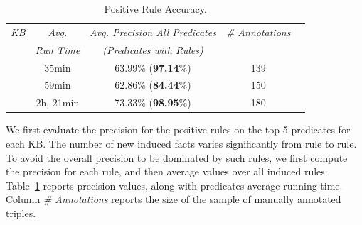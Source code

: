 \begin{table}[b]
	\centering
	\caption{\krd Positive Rule Accuracy.}
		\vspace{-2ex}
	\label{tab:pos_rules_acc}
	\begin{small}
	\begin{tabular}{|c|c|c|c|c|}
		\hline
		\hline
		{\it KB}&{\it Avg.}&{\it Avg. Precision All Predicates}&{\it \# Annotations} \tabularnewline
	       &{\it Run Time} &{\it  (Predicates with Rules)}& \tabularnewline
		\hline
		\dbpedia & 35min & 63.99\% (\textbf{97.14}\%)& 139\tabularnewline
		\yago 3 &  59min & 62.86\% (\textbf{84.44}\%)& 150\tabularnewline
		\wikidata &  2h, 21min & 73.33\% (\textbf{98.95}\%)& 180\tabularnewline
		\hline
	\end{tabular}
	\end{small}
\end{table}


We first evaluate the precision for the positive rules on the top 5 predicates for each KB. 
The number of new induced facts varies significantly from rule to rule.
To avoid the overall precision to be dominated by such rules, we first compute the precision for each rule, 
and then average values over all induced rules.
Table~\ref{tab:pos_rules_acc} reports precision values, along with predicates average running time.
Column \emph{\# Annotations}  reports the size of the sample of manually annotated triples.


